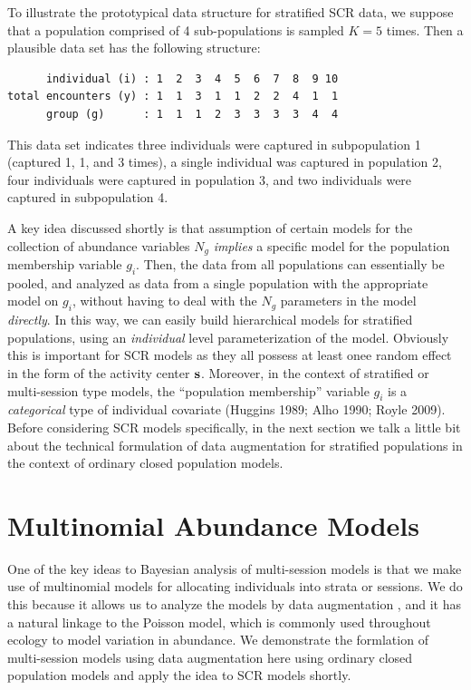 To illustrate the prototypical data structure for stratified SCR data,
we suppose that a population comprised of 4 sub-populations is sampled
$K=5$ times. Then a plausible data set has the following structure:
\begin{verbatim}
      individual (i) : 1  2  3  4  5  6  7  8  9 10  
total encounters (y) : 1  1  3  1  1  2  2  4  1  1
      group (g)      : 1  1  1  2  3  3  3  3  4  4
\end{verbatim}
This data set indicates three individuals were captured in
subpopulation 1 (captured 1, 1, and 3 times), a single individual was
captured in population 2, four individuals were captured in population
3, and two individuals were captured in subpopulation 4.

A key idea discussed shortly is that assumption of certain models for
the collection of abundance variables $N_{g}$ {\it implies} a specific
model for the population membership variable $g_{i}$.  Then, the data
from all populations can essentially be pooled, and analyzed as data
from a single population with the appropriate model on $g_{i}$,
without having to deal with  the $N_{g}$ parameters in the model {\it directly}. In this
way, we can easily build hierarchical models for stratified
populations, using an {\it individual} level parameterization of the
model. Obviously this is important for SCR models as they all possess
at least onee random effect in the form of the activity center ${\bf
  s}$. Moreover, in the context of stratified or multi-session type
models, the ``population membership'' variable $g_{i}$ is a {\it
  categorical} type of individual covariate (Huggins 1989; Alho 1990;
Royle 2009).  Before considering SCR models specifically, in the next
section we talk a
little bit about the technical formulation of data augmentation for
stratified populations in the context of ordinary closed population
models. 


\section{Multinomial Abundance Models}


One of the key ideas to Bayesian analysis of multi-session models is
that we make use of multinomial models for allocating individuals into
strata or sessions. We do this because it allows us to analyze the
models by data augmentation \citep{converse_royle:2012,
  royle_converse:2013}, and it has a natural linkage to the Poisson
model, which is commonly used throughout ecology to model variation
in abundance. We demonstrate the formlation of multi-session models
using data augmentation here using ordinary closed population models
and apply the idea to SCR models shortly.

